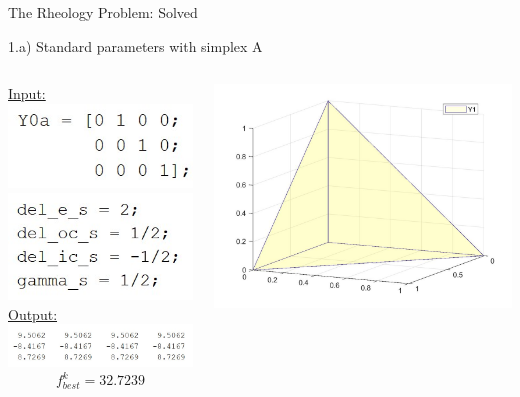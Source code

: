 \documentclass{beamer}
\begin{document}
\begin{frame}{The Rheology Problem: Solved}
\begin{block}{1.a) Standard parameters with simplex A}
\begin{columns}
\begin{column}{0.35\linewidth}
	\underline{Input:}\\
	\includegraphics[width=0.45\linewidth]{Y0a}\\
	\includegraphics[width=0.45\linewidth]{StandardParams}\\
	\vspace{0.65cm}
	\underline{Output:}\\
	\includegraphics[width=0.95\linewidth]{1aSimplex}
	$$f^k_{best} = 32.7239$$
	\vspace{0.1cm}
\end{column}
\begin{column}{0.63\linewidth}
	\includegraphics[width=0.45\linewidth]{Simplex1}\\

\end{column}
\end{columns}
\end{block}
\end{frame}
\end{document}
